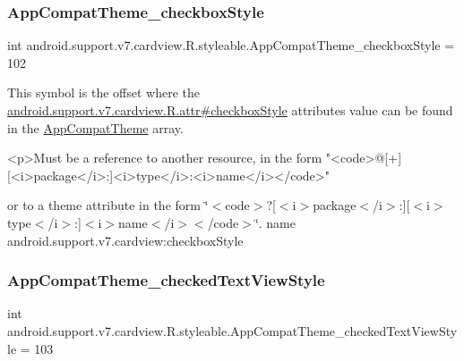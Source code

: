 \subsubsection{\texorpdfstring{App\+Compat\+Theme\+\_\+checkbox\+Style}{AppCompatTheme\_checkboxStyle}}
{\footnotesize\ttfamily int android.\+support.\+v7.\+cardview.\+R.\+styleable.\+App\+Compat\+Theme\+\_\+checkbox\+Style = 102\hspace{0.3cm}{\ttfamily [static]}}

This symbol is the offset where the \hyperlink{classandroid_1_1support_1_1v7_1_1cardview_1_1R_1_1attr_a7af958624cb74038f99dd3a6e7a9594f}{android.\+support.\+v7.\+cardview.\+R.\+attr\#checkbox\+Style} attribute\textquotesingle{}s value can be found in the \hyperlink{classandroid_1_1support_1_1v7_1_1cardview_1_1R_1_1styleable_a52e6f69f954ecc2622d72c0b4d298938}{App\+Compat\+Theme} array.

\begin{DoxyVerb}      <p>Must be a reference to another resource, in the form "<code>@[+][<i>package</i>:]<i>type</i>:<i>name</i></code>"
\end{DoxyVerb}
 or to a theme attribute in the form \char`\"{}$<$code$>$?\mbox{[}$<$i$>$package$<$/i$>$\+:\mbox{]}\mbox{[}$<$i$>$type$<$/i$>$\+:\mbox{]}$<$i$>$name$<$/i$>$$<$/code$>$\char`\"{}.  name android.\+support.\+v7.\+cardview\+:checkbox\+Style \mbox{\label{classandroid_1_1support_1_1v7_1_1cardview_1_1R_1_1styleable_aaefec504d42232e1b60c6846dbcb882f}} 
\subsubsection{\texorpdfstring{App\+Compat\+Theme\+\_\+checked\+Text\+View\+Style}{AppCompatTheme\_checkedTextViewStyle}}
{\footnotesize\ttfamily int android.\+support.\+v7.\+cardview.\+R.\+styleable.\+App\+Compat\+Theme\+\_\+checked\+Text\+View\+Style = 103\hspace{0.3cm}{\ttfamily [static]}}

